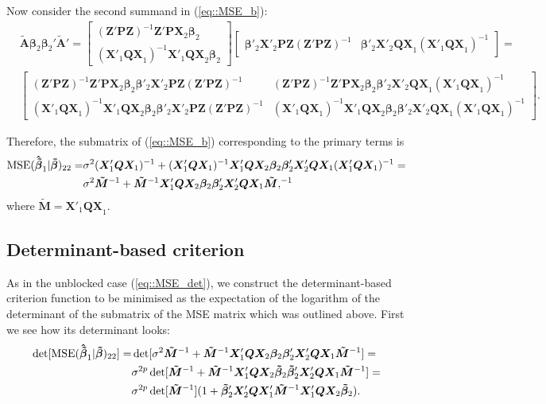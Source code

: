 Now consider the second summand in (\ref{eq::MSE_b}):
\begin{align*}
&\bm{\tilde{A}}\bm{\beta}_2\bm{\beta}_2'\bm{\tilde{A}}'=
\begin{bmatrix}
(\bm{Z}'\bm{PZ})^{-1}\bm{Z}'\bm{PX}_{2}\bm{\beta}_2 \\
(\bm{X}'_{1}\bm{QX}_{1})^{-1}\bm{X}'_{1}\bm{QX}_{2}\bm{\beta}_2
\end{bmatrix}
\begin{bmatrix}
\bm{\beta}'_2\bm{X}'_{2}\bm{PZ}(\bm{Z}'\bm{PZ})^{-1} & \bm{\beta}'_2\bm{X}'_{2}\bm{QX}_{1}(\bm{X}'_{1}\bm{QX}_{1})^{-1}
\end{bmatrix}=\\
&\begin{bmatrix}
(\bm{Z}'\bm{PZ})^{-1}\bm{Z}'\bm{PX}_{2}\bm{\beta}_2\bm{\beta}'_2\bm{X}'_{2}\bm{PZ}(\bm{Z}'\bm{PZ})^{-1} & (\bm{Z}'\bm{PZ})^{-1}\bm{Z}'\bm{PX}_{2}\bm{\beta}_2\bm{\beta}'_2\bm{X}'_{2}\bm{QX}_{1}(\bm{X}'_{1}\bm{QX}_{1})^{-1} \\
(\bm{X}'_{1}\bm{QX}_{1})^{-1}\bm{X}'_{1}\bm{QX}_{2}\bm{\beta}_2\bm{\beta}'_2\bm{X}'_{2}\bm{PZ}(\bm{Z}'\bm{PZ})^{-1} & (\bm{X}'_{1}\bm{QX}_{1})^{-1}\bm{X}'_{1}\bm{QX}_{2}\bm{\beta}_2\bm{\beta}'_2\bm{X}'_{2}\bm{QX}_{1}(\bm{X}'_{1}\bm{QX}_{1})^{-1}
\end{bmatrix}.
\end{align*}

Therefore, the submatrix of (\ref{eq::MSE_b}) corresponding to the primary terms is
\begin{align}
\label{eq::mesb_submatrix}
\mbox{MSE}(\bm{\hat{\tilde{\beta}}}_1|\bm{\tilde{\beta}})_{22}=&\sigma^2(\bm{X}'_{1}\bm{QX}_{1})^{-1}+(\bm{X}'_{1}\bm{QX}_{1})^{-1}\bm{X}'_{1}\bm{QX}_{2}\bm{\beta}_2\bm{\beta}'_2\bm{X}'_{2}\bm{QX}_{1}(\bm{X}'_{1}\bm{QX}_{1})^{-1}=\notag\\& \sigma^2\bm{\tilde{M}}^{-1}+\bm{\tilde{M}}^{-1}\bm{X}'_{1}\bm{QX}_{2}\bm{\beta}_2\bm{\beta}'_2\bm{X}'_{2}\bm{QX}_{1}\bm{\tilde{M}},^{-1}
\end{align}
where $\bm{\tilde{M}}=\bm{X}'_{1}\bm{QX}_{1}.$
\subsection{Determinant-based criterion}
As in the unblocked case (\ref{eq::MSE_det}), we construct the determinant-based criterion function to be minimised as the expectation of the logarithm of the determinant of the submatrix of the MSE matrix which was outlined above. First we see how its determinant looks:
\begin{align}
\label{eq::MSE_B_det}
\det[\mbox{MSE}(\bm{\hat{\tilde{\beta}}}_1|\bm{\tilde{\beta}})_{22}]=&\det[\sigma^2\bm{\tilde{M}}^{-1}+\bm{\tilde{M}}^{-1}\bm{X}'_{1}\bm{QX}_{2}\bm{\beta}_2\bm{\beta}'_2\bm{X}'_{2}\bm{QX}_{1}\bm{\tilde{M}}^{-1}]=\notag\\& \sigma^{2p}\det[\bm{\tilde{M}}^{-1}+\bm{\tilde{M}}^{-1}\bm{X}'_{1}\bm{QX}_{2}\bm{\tilde{\beta}}_2\bm{\tilde{\beta}}'_2\bm{X}'_{2}\bm{QX}_{1}\bm{\tilde{M}}^{-1}]=\notag\\& \sigma^{2p}\det[\bm{\tilde{M}}^{-1}](1+\bm{\tilde{\beta}}'_2\bm{X}'_{2}\bm{QX}'_{1}\bm{\tilde{M}}^{-1}\bm{X}'_{1}\bm{QX}_{2}\bm{\tilde{\beta}}_2).
\end{align}

